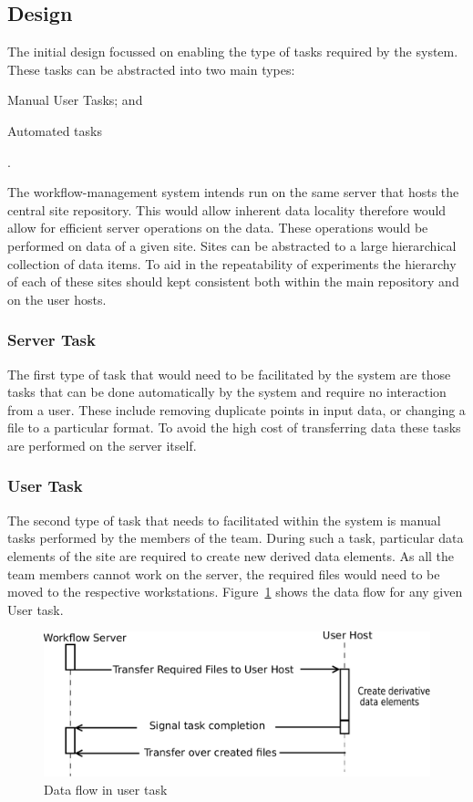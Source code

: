 \documentclass[12pt,a4paper]{report}
\begin{document}
\subsection{Design}
The initial design focussed on enabling the type of tasks required by the system.
These tasks can be abstracted into two main types: \begin{inparaenum}[(i)] \item
Manual User Tasks; and \item Automated tasks\end{inparaenum}.


The workflow-management system intends run on the same server that hosts the central
site repository. This would allow inherent data locality therefore would allow for
efficient server operations on the data. These operations would be performed on data
of a given site. Sites can be abstracted to a large hierarchical collection of data
items. To aid in the repeatability of experiments the hierarchy of each of these
sites should kept consistent both within the main repository and on the user hosts.

\subsubsection*{Server Task}
The first type of task that would need to be facilitated by the system are those
tasks that can be done automatically by the system and require no interaction
from a user. These include removing duplicate points in input data, or changing
a file to a particular format. To avoid the high cost of transferring data these
tasks are performed on the server itself.

\subsubsection*{User Task}
The second type of task that needs to facilitated within the system is manual
tasks performed by the members of the team. During such a task, particular data
elements of the site are required to create new derived data elements. As all the
team members cannot work on the server, the required files would need to be moved
to the respective workstations. Figure~\ref{data_flow} shows the data flow for any given
User task.
\begin{figure}[!h]
    \begin{center}
        \includegraphics[scale=0.5]{figures/data_flow.pdf}
    \end{center}
    \caption{Data flow in user task}
    \label{data_flow}
\end{figure}
\end{document}
